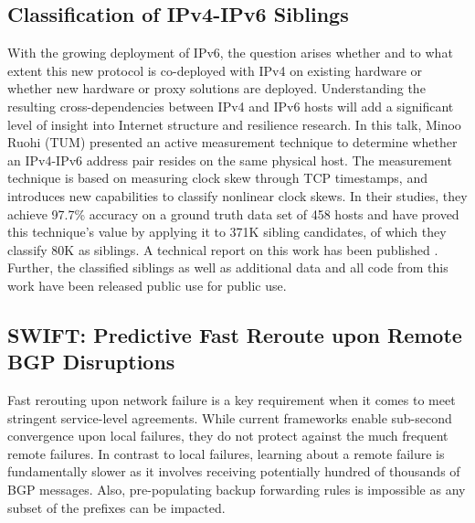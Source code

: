 \subsection{Classification of IPv4-IPv6 Siblings}

With the growing deployment of IPv6, the question arises whether and to what
extent this new protocol is co-deployed with IPv4 on existing hardware or
whether new hardware or proxy solutions are deployed. Understanding the
resulting cross-dependencies between IPv4 and IPv6 hosts will add a
significant level of insight into Internet structure and resilience research.
In this talk, Minoo Ruohi (TUM) presented an active measurement technique to
determine whether an IPv4-IPv6 address pair resides on the same physical host.
The measurement technique is based on measuring clock skew through TCP
timestamps, and introduces new capabilities to classify nonlinear clock skews.
In their studies, they achieve 97.7\% accuracy on a ground truth data set of
458 hosts and have proved this technique's value by applying it to 371K
sibling candidates, of which they classify 80K as siblings. A technical report
on this work has been published \cite{qscheitle:arxiv:2016}. Further, the
classified siblings as well as additional data and all code from this work
have been released public use \cite{qscheitle:arxiv:2016} for public use.


\subsection{SWIFT: Predictive Fast Reroute upon Remote BGP Disruptions}

Fast rerouting upon network failure is a key requirement when it comes to meet
stringent service-level agreements. While current frameworks enable sub-second
convergence upon local failures, they do not protect against the much frequent
remote failures. In contrast to local failures, learning about a remote
failure is fundamentally slower as it involves receiving potentially hundred
of thousands of BGP messages. Also, pre-populating backup forwarding rules is
impossible as any subset of the prefixes can be impacted.

